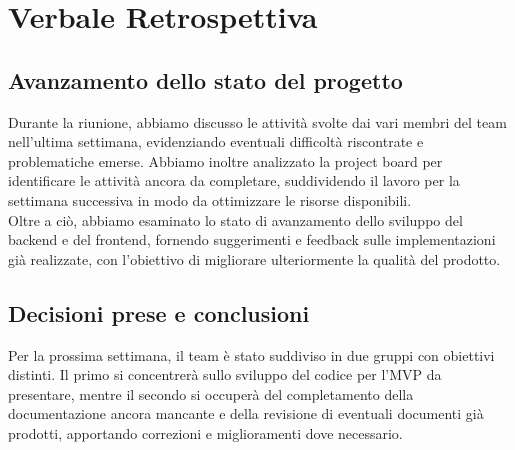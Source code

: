 \documentclass{article}
\newcommand{\isEsterno}{0}
\begin{document}
\newpage
\section{Verbale Retrospettiva}
\subsection{Avanzamento dello stato del progetto}  
Durante la riunione, abbiamo discusso le attività svolte dai vari membri del team nell'ultima settimana, evidenziando eventuali difficoltà riscontrate e problematiche emerse. Abbiamo inoltre analizzato la project board per identificare le attività ancora da completare, suddividendo il lavoro per la settimana successiva in modo da ottimizzare le risorse disponibili.  \\
Oltre a ciò, abbiamo esaminato lo stato di avanzamento dello sviluppo del backend e del frontend, fornendo suggerimenti e feedback sulle implementazioni già realizzate, con l'obiettivo di migliorare ulteriormente la qualità del prodotto.  

\subsection{Decisioni prese e conclusioni}  
Per la prossima settimana, il team è stato suddiviso in due gruppi con obiettivi distinti. Il primo si concentrerà sullo sviluppo del codice per l'MVP da presentare, mentre il secondo si occuperà del completamento della documentazione ancora mancante e della revisione di eventuali documenti già prodotti, apportando correzioni e miglioramenti dove necessario.  


\ifthenelse{\equal{\isEsterno}{1}}{
    \begin{table}[b]
        \begin{tabular}{@{}p{.5in}p{4in}@{}}
            Data:  & \hrulefill \\
                   &     		\\
                   &     		\\
            Firma: & \hrulefill \\
        \end{tabular}
        \end{table}
}{}
\end{document}
